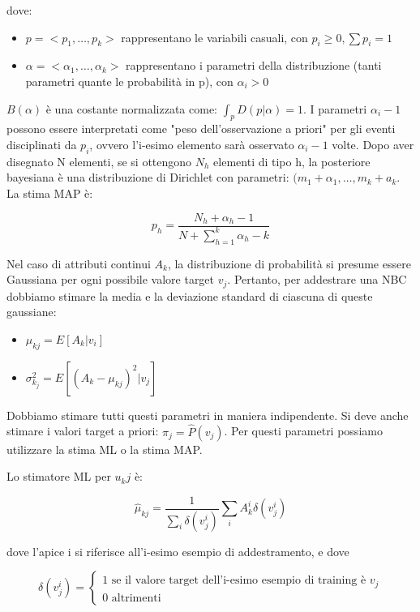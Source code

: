 \documentclass[a4paper]{extarticle}
\begin{document}
dove:

\begin{itemize}
\item $p = <p_1,\dots,p_k>$ rappresentano le variabili casuali, con $p_i \geq 0, \sum p_i =1$
\item $\alpha = <\alpha_1, \dots, \alpha_k>$ rappresentano i parametri della distribuzione (tanti parametri quante le probabilità in p), con $\alpha_i>0$
\end{itemize}

$B(\alpha)$ è una costante normalizzata come: $\int_p D(p| \alpha) =1$. I parametri $\alpha_i-1$ possono essere interpretati come "peso dell'osservazione a priori" per gli eventi disciplinati da $p_i$, ovvero l'i-esimo elemento sarà osservato $\alpha_i-1$ volte. Dopo aver disegnato N elementi, se si ottengono $N_h$ elementi di tipo h, la posteriore bayesiana è una distribuzione di Dirichlet con parametri: $(m_1 + \alpha_1, \dots, m_k+a_k$. La stima MAP è:

\begin{equation*}
p_h = \dfrac{N_h + \alpha_h - 1}{N + \sum\limits_{h=1}^k \alpha_h - k}
\end{equation*}

Nel caso di attributi continui $A_k$, la distribuzione di probabilità si presume essere Gaussiana per ogni possibile valore target $v_j$. Pertanto, per addestrare una NBC dobbiamo stimare la media e la deviazione standard di ciascuna di queste gaussiane:

\begin{itemize}
\item $\mu_{kj} = E[A_k|v_i] $
\item $\sigma_{k_j}^2 = E[(A_k - \mu_{kj})^2|v_j]$
\end{itemize}

Dobbiamo stimare tutti questi parametri in maniera indipendente. Si deve anche stimare i valori target a priori: $\pi_j = \hat P(v_j)$. Per questi parametri possiamo utilizzare la stima ML o la stima MAP. 

Lo stimatore ML per $u_kj$ è:

\begin{equation*}
\hat \mu_{kj} = \dfrac{1}{\sum\limits_i \delta(v_j^i)} \sum\limits_i A_k^i \delta(v_j^i)
\end{equation*} 

dove l'apice i si riferisce all'i-esimo esempio di addestramento, e dove

\begin{equation*}
\delta(v_j^i) = 
\begin{cases}
		1 \text{ se il valore target dell'i-esimo esempio di training è } v_j \\
		0 \text{ altrimenti}
	\end{cases}
\end{equation*}
\end{document}
